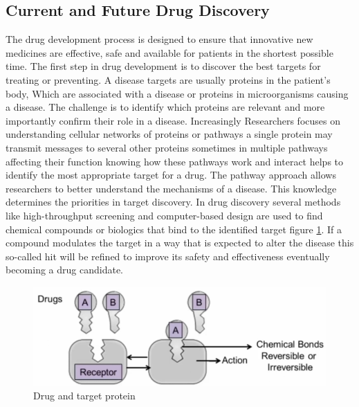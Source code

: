 \documentclass[10pt,twocolumn,letterpaper]{article}
\begin{document}
\subsection{Current and Future Drug Discovery }

 The drug development process is designed to ensure that innovative new medicines are effective, safe and available for patients in the shortest possible time. The first step in drug development is to discover the best targets for treating or preventing. A disease targets are usually proteins in the patient's body, Which are associated with a disease or proteins in microorganisms causing a disease. The challenge is to identify which proteins are relevant and more importantly confirm their role in a disease. Increasingly Researchers focuses on understanding cellular networks of proteins or pathways a single protein may transmit messages to several other proteins sometimes in multiple pathways affecting their function knowing how these pathways work and interact helps to identify the most appropriate target for a drug. The pathway approach allows researchers to better understand the mechanisms of a disease. This knowledge determines the priorities in target discovery. In drug discovery several methods like high-throughput screening and computer-based design are used to find chemical compounds or biologics that bind to the identified target figure \ref{fig:drugs_recep}. If a compound modulates the target in a way that is expected to alter the disease this so-called hit will be refined to improve its safety and effectiveness eventually becoming a drug candidate.



\begin{figure}[h!]
  \includegraphics[width=\linewidth]{drugs_recep.png}
  \caption{Drug and target protein }
  \label{fig:drugs_recep}
\end{figure}
\end{document}
